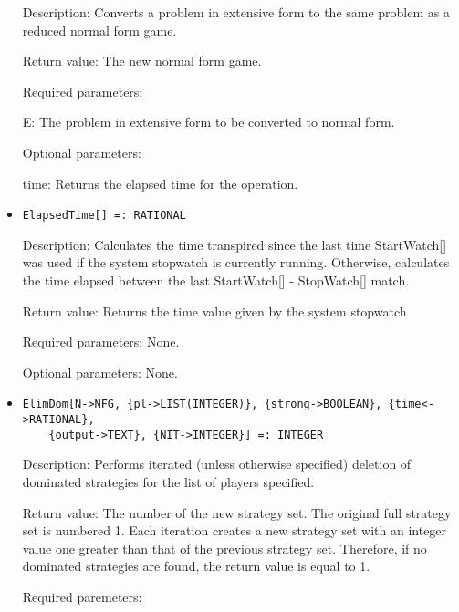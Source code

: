 \begin{itemize}
\bd
\item
[Description:] Converts a problem in extensive form to the same problem
as a reduced normal form game.
\item
[Return value:] The new normal form game.  
\item
[Required parameters:]\hfil\null
	
\bd
\item
[ E:] The problem in extensive form to be converted to normal form.
\ed

\item
[Optional parameters:]\hfil\null
	
\bd
\item
[ time:] Returns the elapsed time for the operation.
\ed
\ed

\item

\protect \large \begin{verbatim}
ElapsedTime[] =: RATIONAL
\end{verbatim}\normalsize

\bd
\item
[Description:] Calculates the time transpired since the last time 
StartWatch[] was used if the system stopwatch is currently running.
Otherwise, calculates the time elapsed between the last StartWatch[] -
StopWatch[] match.
\item
[Return value:] Returns the time value given by the system stopwatch
\item
[Required parameters:]  None.
\item   
[Optional parameters:] None.
\ed

\item
\protect \large \begin{verbatim}
ElimDom[N->NFG, {pl->LIST(INTEGER)}, {strong->BOOLEAN}, {time<->RATIONAL}, 
	{output->TEXT}, {NIT->INTEGER}] =: INTEGER
\end{verbatim}
\normalsize

\bd
\item
[Description:] Performs iterated (unless otherwise specified) deletion 
of dominated strategies for the list of players specified.  
\item  
[Return value:] The number of the new strategy set.  The original full
strategy set is numbered 1.  Each iteration creates a new strategy set
with an integer value one greater than that of the previous strategy 
set.  Therefore, if no dominated strategies are found, the return value
is equal to 1.
\item
[Required paremeters:]\hfil\null
	

\end{itemize}

